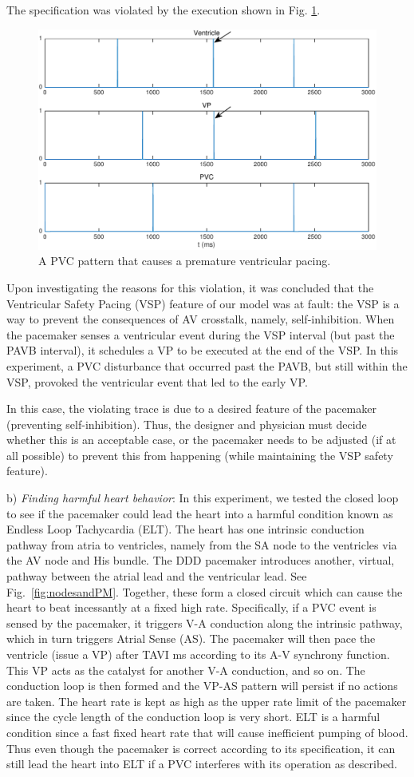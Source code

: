 The specification was violated by the execution shown in Fig. \ref{fig:bug8_kept1}.
\begin{figure}[tb]
\centering
\includegraphics[width=0.7\linewidth]{figures/bug8_kept1}
\caption{A PVC pattern that causes a premature ventricular pacing.}
\label{fig:bug8_kept1}
\end{figure}
Upon investigating the reasons for this violation, it was concluded that the Ventricular Safety Pacing (VSP) feature of our model was at fault: the VSP is a way to prevent the consequences of AV crosstalk, namely, self-inhibition. 
When the pacemaker senses a ventricular event during the VSP interval (but past the PAVB interval), it schedules a VP to be executed at the end of the VSP.
In this experiment, a PVC disturbance that occurred past the PAVB, but still within the VSP, provoked the ventricular event that led to the early VP.

In this case, the violating trace is due to a desired feature of the pacemaker (preventing self-inhibition).
Thus, the designer and physician must decide whether this is an acceptable case, or the pacemaker needs to be adjusted (if at all possible) to prevent this from happening (while maintaining the VSP safety feature).

b) \emph{Finding harmful heart behavior}: In this experiment, we tested the closed loop to see if the pacemaker could lead the heart into a harmful condition known as Endless Loop Tachycardia (ELT).
%
The heart has one intrinsic conduction pathway from atria to ventricles, namely from the SA node to the ventricles via the AV node and His bundle.
The DDD pacemaker introduces another, virtual, pathway between the atrial lead and the ventricular lead.
See Fig.~\ref{fig:nodesandPM}.
Together, these form a closed circuit which can cause the heart to beat incessantly at a fixed high rate.
Specifically, if a PVC event is sensed by the pacemaker, it triggers V-A conduction along the intrinsic pathway, 
which in turn triggers Atrial Sense (AS). 
The pacemaker will then pace the ventricle (issue a VP) after TAVI ms according to its A-V synchrony function. 
This VP acts as the catalyst for another V-A conduction, and so on.
The conduction loop is then formed and the VP-AS pattern will persist if no actions are taken.
The heart rate is kept as high as the upper rate limit of the pacemaker since the cycle length of the conduction loop is very short. 
ELT is a harmful condition since a fast fixed heart rate that will cause inefficient pumping of blood.
Thus even though the pacemaker is correct according to its specification, it can still lead the heart into ELT if a PVC interferes with its operation as described.
%

